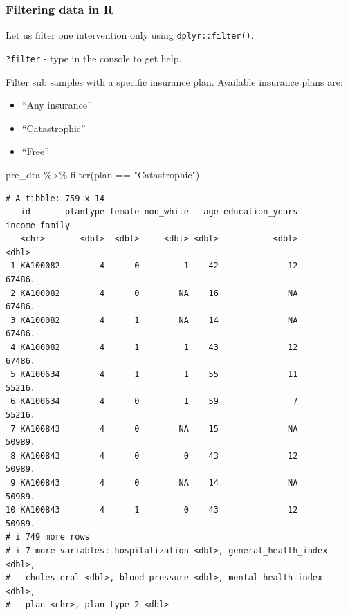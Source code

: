 \documentclass[
  letterpaper,
  DIV=11,
  numbers=noendperiod]{scrartcl}
\newenvironment{Shaded}{\begin{snugshade}}{\end{snugshade}}
\newcommand{\FunctionTok}[1]{\textcolor[rgb]{0.28,0.35,0.67}{#1}}
\newcommand{\NormalTok}[1]{\textcolor[rgb]{0.00,0.23,0.31}{#1}}
\newcommand{\SpecialCharTok}[1]{\textcolor[rgb]{0.37,0.37,0.37}{#1}}
\newcommand{\StringTok}[1]{\textcolor[rgb]{0.13,0.47,0.30}{#1}}
\providecommand{\tightlist}{%
  \setlength{\itemsep}{0pt}\setlength{\parskip}{0pt}}\usepackage{longtable,booktabs,array}
\begin{document}
\hypertarget{filtering-data-in-r}{%
\subsubsection{Filtering data in R}\label{filtering-data-in-r}}

Let us filter one intervention only using \texttt{dplyr::filter()}.

\texttt{?filter} - type in the console to get help.

Filter sub samples with a specific insurance plan. Available insurance
plans are:

\begin{itemize}
\tightlist
\item
  ``Any insurance''
\item
  ``Catastrophic''
\item
  ``Free''
\end{itemize}

\begin{Shaded}
\begin{Highlighting}[]
\NormalTok{pre\_dta }\SpecialCharTok{\%\textgreater{}\%} \FunctionTok{filter}\NormalTok{(plan }\SpecialCharTok{==} \StringTok{"Catastrophic"}\NormalTok{)}
\end{Highlighting}
\end{Shaded}

\begin{verbatim}
# A tibble: 759 x 14
   id       plantype female non_white   age education_years income_family
   <chr>       <dbl>  <dbl>     <dbl> <dbl>           <dbl>         <dbl>
 1 KA100082        4      0         1    42              12        67486.
 2 KA100082        4      0        NA    16              NA        67486.
 3 KA100082        4      1        NA    14              NA        67486.
 4 KA100082        4      1         1    43              12        67486.
 5 KA100634        4      1         1    55              11        55216.
 6 KA100634        4      0         1    59               7        55216.
 7 KA100843        4      0        NA    15              NA        50989.
 8 KA100843        4      0         0    43              12        50989.
 9 KA100843        4      0        NA    14              NA        50989.
10 KA100843        4      1         0    43              12        50989.
# i 749 more rows
# i 7 more variables: hospitalization <dbl>, general_health_index <dbl>,
#   cholesterol <dbl>, blood_pressure <dbl>, mental_health_index <dbl>,
#   plan <chr>, plan_type_2 <dbl>
\end{verbatim}
\end{document}

